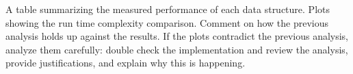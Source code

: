 A table summarizing the measured performance of each data structure. Plots showing the run time complexity comparison. Comment on how the previous analysis holds up against the results. If the plots contradict the previous analysis, analyze them carefully: double check the implementation and review the analysis, provide justifications, and explain why this is happening.
